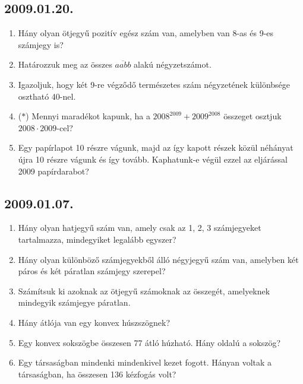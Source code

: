 \subsection*{2009.01.20.}
\begin{enumerate}
\item Hány olyan ötjegyű pozitív egész szám van, amelyben van 8-as és 9-es számjegy is? 
\item Határozzuk meg az összes $\overline{aabb}$ alakú négyzetszámot.
\item Igazoljuk, hogy két 9-re végződő természetes szám négyzetének különbsége osztható 40-nel.
\item ($*$) Mennyi maradékot kapunk, ha a $2008^{2009}+2009^{2008}$ összeget
osztjuk $2008\cdot 2009$-cel?
\item Egy papírlapot 10 részre vágunk, majd az így kapott részek közül néhányat újra 10 részre vágunk és így tovább. Kaphatunk-e végül ezzel az eljárással 2009 
papírdarabot?
\end{enumerate}

\subsection*{2009.01.07.}
\begin{enumerate}
\item Hány olyan hatjegyű szám van, amely csak az 1, 2, 3 számjegyeket tartalmazza,
mindegyiket legalább egyszer?
\item Hány olyan különböző számjegyekből álló négyjegyű szám van, amelyben két páros és két páratlan számjegy szerepel?
\item Számítsuk ki azoknak az ötjegyű számoknak az összegét, amelyeknek mindegyik számjegye páratlan.
\item Hány átlója van egy konvex húszszögnek?
\item Egy konvex sokszögbe összesen 77 átló húzható. Hány oldalú a sokszög?
\item Egy társaságban mindenki mindenkivel kezet fogott. Hányan voltak a társaságban, ha összesen 136 kézfogás volt?
\end{enumerate}

